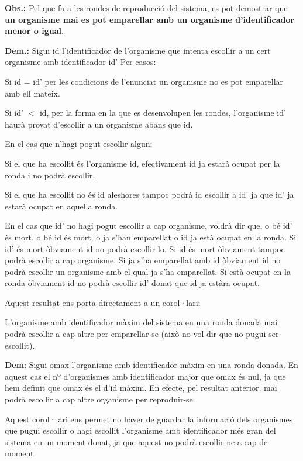 {\bfseries Obs.\-:} Pel que fa a les rondes de reproducció del sistema, es pot demostrar que {\bfseries un organisme mai es pot emparellar amb un organisme d'identificador menor o igual}.\par
 {\bfseries Dem.\-:} Sigui {\ttfamily id} l'identificador de l'organisme que intenta escollir a un cert organisme amb identificador {\ttfamily id'} Per casos\-: 
\begin{DoxyItemize}
\item Si {\ttfamily id} = {\ttfamily id'} per les condicions de l'enunciat un organisme no es pot emparellar amb ell mateix.  
\item Si {\ttfamily id'} $<$ {\ttfamily id}, per la forma en la que es desenvolupen les rondes, l'organisme {\ttfamily id'} haurà provat d'escollir a un organisme abans que {\ttfamily id}. 
\begin{DoxyItemize}
\item En el cas que n'hagi pogut escollir algun\-: 
\begin{DoxyItemize}
\item Si el que ha escollit és l'organisme {\ttfamily id}, efectivament {\ttfamily id} ja estarà ocupat per la ronda i no podrà escollir.  
\item Si el que ha escollit no és {\ttfamily id} aleshores tampoc podrà {\ttfamily id} escollir a {\ttfamily id'} ja que {\ttfamily id'} ja estarà ocupat en aquella ronda.  
\end{DoxyItemize}
\item En el cas que {\ttfamily id'} no hagi pogut escollir a cap organisme, voldrà dir que, o bé {\ttfamily id'} és mort, o bé {\ttfamily id} és mort, o ja s'han emparellat o {\ttfamily id} ja està ocupat en la ronda. Si {\ttfamily id'} és mort òbviament {\ttfamily id} no podrà escollir-\/lo. Si {\ttfamily id} és mort òbviament tampoc podrà escollir a cap organisme. Si ja s'ha emparellat amb {\ttfamily id} òbviament {\ttfamily id} no podrà escollir un organisme amb el qual ja s'ha emparellat. Si està ocupat en la ronda òbviament {\ttfamily id} no podrà escollir {\ttfamily id'} donat que {\ttfamily id} ja estàra ocupat.  
\end{DoxyItemize}
\end{DoxyItemize}

Aquest resultat ens porta directament a un corol·lari\-: 
\begin{DoxyEnumerate}
\item L'organisme amb identificador màxim del sistema en una ronda donada mai podrà escollir a cap altre per emparellar-\/se (això no vol dir que no pugui ser escollit). \par
 {\bfseries Dem}\-: Sigui {\ttfamily omax} l'organisme amb identificador màxim en una ronda donada. En aquest cas el nº d'organismes amb identificador major que {\ttfamily omax} és nul, ja que hem definit que {\ttfamily omax} és el d'id màxim. En efecte, pel resultat anterior, mai podrà escollir a cap altre organisme per reproduir-\/se. 
\end{DoxyEnumerate}Aquest corol·lari ens permet no haver de guardar la informació dels organismes que pugui escollir o hagi escollit l'organisme amb identificador més gran del sistema en un moment donat, ja que aquest no podrà escollir-\/ne a cap de moment. 

